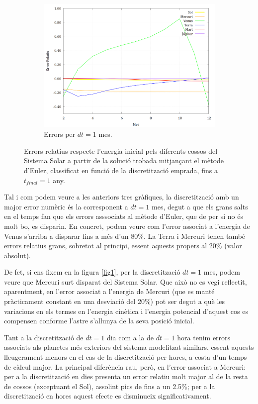 \documentclass[10pt, twoside, a4paper]{article}
\begin{document}
\begin{figure}[h!]
\begin{subfigure}[b]{0.32\linewidth}
        \includegraphics[width=\linewidth]{../Error/error_1_mes.png}
        \caption{Errors per $dt=1$ mes.}
    \end{subfigure}
    
    \caption{Errors relatius respecte l'energia inicial pels diferents cossos del Sistema Solar a partir de la solució trobada mitjançant el mètode d'Euler, classificat en funció de la discretització emprada, fins a $t_{final}=1$ any.}
    \label{fig3}
\end{figure}

Tal i com podem veure a les anteriors tres gràfiques, la discretització amb un major error numèric és la corresponent a $dt = 1$ mes, degut a que els grans salts en el temps fan que els errors asssociats al mètode d'Euler, que de per si no és molt bo, es disparin. En concret, podem veure com l'error associat a l'energia de Venus s'arriba a disparar fins a més d'un 80\%. La Terra i Mercuri tenen també errors relatius grans, sobretot al principi, essent aquests propers al 20\% (valor absolut). 

De fet, si ens fixem en la figura \ref{fig1}, per la discretització $dt=1$ mes, podem veure que Mercuri surt disparat del Sistema Solar. Que això no es vegi reflectit, aparentment, en l'error associat a l'energia de Mercuri (que es manté pràcticament constant en una desviació del 20\%) pot ser degut a què les variacions en els termes en l'energia cinètica i l'energia potencial d'aquest cos es compensen conforme l'astre s'allunya de la seva posició inicial.

Tant a la discretització de $dt = 1$ dia com a la de $dt = 1$ hora tenim errors associats als planetes més exteriors del sistema modelitzat similars, essent aquests lleugerament menors en el cas de la discretització per hores, a costa d'un temps de càlcul major. La principal diferència rau, però, en l'error associat a Mercuri: per a la discretització en dies presenta un error relatiu molt major al de la resta de cossos (exceptuant el Sol), assolint pics de fins a un 2.5\%; per a la discretització en hores aquest efecte es disminueix significativament.
\end{document}
